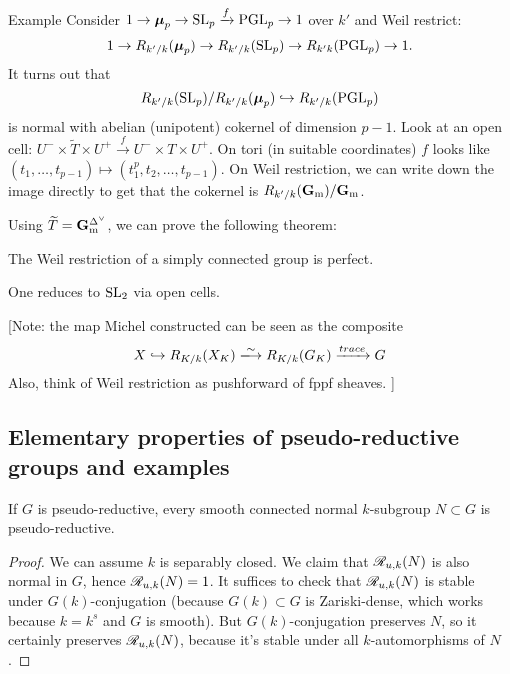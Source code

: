 \begin{enonce}[remark]{Example}
Consider 
$1 \to \boldsymbol\mu_p \to \operatorname{SL}_p \xrightarrow f \operatorname{PGL}_p \to 1$ 
over $k'$ and Weil restrict: 
\[
  1 \to R_{k'/k}(\boldsymbol\mu_p) \to R_{k'/k}(\operatorname{SL}_p) \to R_{k'k}(\operatorname{PGL}_p) \to 1. 
\]
It turns out that 
\[
  R_{k'/k}(\operatorname{SL}_p)/R_{k'/k}(\boldsymbol\mu_p) \hookrightarrow R_{k'/k}(\operatorname{PGL}_p) 
\]
is normal with abelian (unipotent) cokernel of dimension $p-1$. Look at an open 
cell: $U^-\times \widetilde T\times U^+ \xrightarrow f U^- \times T \times U^+$. 
On tori (in suitable coordinates) $f$ looks like $(t_1,\dots,t_{p-1})\mapsto (t_1^p,t_2,\dots,t_{p-1})$. 
On Weil restriction, we can write down the image directly to get that the cokernel 
is $R_{k'/k} (\mathbf{G}_{\mathrm{m}})/\mathbf{G}_{\mathrm{m}}$. 
\end{enonce}

Using $\widetilde T=\mathbf{G}_{\mathrm{m}}^{\Delta^\vee}$, we can prove the following theorem: 

\begin{theo}
The Weil restriction of a simply connected group is perfect. 
\end{theo}

One reduces to $\operatorname{SL}_2$ via open cells. 

[Note: the map Michel constructed can be seen as the composite 
\[
  X \hookrightarrow R_{K/k}(X_K) \isomorphism R_{K/k}(G_K) \xrightarrow{trace} G
\]
Also, think of Weil restriction as pushforward of fppf sheaves. 
]





\subsection{Elementary properties of pseudo-reductive groups and examples}

\begin{lemm}
If $G$ is pseudo-reductive, every smooth connected normal $k$-subgroup 
$N\subset G$ is pseudo-reductive. 
\end{lemm}
\begin{proof}
We can assume $k$ is separably closed. We claim that $\mathscr{R}_{u,k}(N)$ is also normal 
in $G$, hence $\mathscr{R}_{u,k}(N)=1$. It suffices to check that $\mathscr{R}_{u,k}(N)$ is 
stable under $G(k)$-conjugation (because $G(k)\subset G$ is Zariski-dense, which 
works because $k=k^s$ and $G$ is smooth). But $G(k)$-conjugation preserves $N$, 
so it certainly preserves $\mathscr{R}_{u,k}(N)$, because it's stable under all 
$k$-automorphisms of $N$. 
\end{proof}


